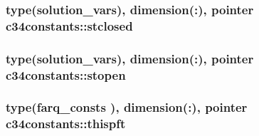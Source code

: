 \subsubsection[{stclosed}]{\setlength{\rightskip}{0pt plus 5cm}type({\bf solution\+\_\+vars}), dimension(\+:), pointer c34constants\+::stclosed}\label{namespacec34constants_a083891d928147a7252ada72b49b240a3}
\hypertarget{namespacec34constants_a5affd928720d3a40f01f1198b68b7fb3}{}
\subsubsection[{stopen}]{\setlength{\rightskip}{0pt plus 5cm}type({\bf solution\+\_\+vars}), dimension(\+:), pointer c34constants\+::stopen}\label{namespacec34constants_a5affd928720d3a40f01f1198b68b7fb3}
\hypertarget{namespacec34constants_a4a1314df0becf145f8a2365aa27d992d}{}
\subsubsection[{thispft}]{\setlength{\rightskip}{0pt plus 5cm}type({\bf farq\+\_\+consts} ), dimension(\+:), pointer c34constants\+::thispft}\label{namespacec34constants_a4a1314df0becf145f8a2365aa27d992d}
